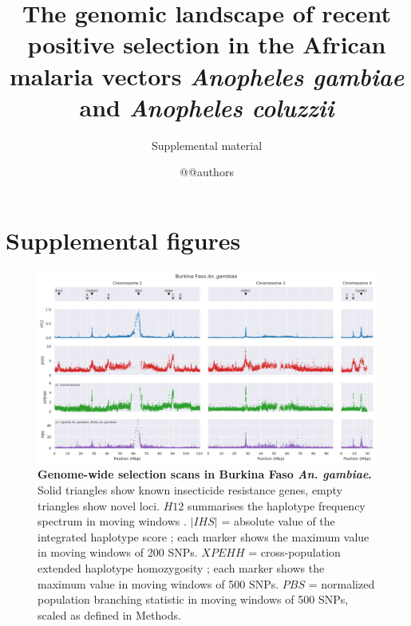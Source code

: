 \documentclass[a4paper,11pt,abstracton,hidelinks]{scrartcl}
\title{
The genomic landscape of recent positive selection in the African malaria vectors \textit{Anopheles gambiae} and \textit{Anopheles coluzzii}
}
\subtitle{\large{Supplemental material}}
\author{@@authors}
\begin{document}
\maketitle

\beginsupplement

\tableofcontents
\listoffigures
\listoftables

\clearpage


\section{Supplemental figures}


\begin{landscape}

\begin{figure}[t!]
	\begin{center}
		\includegraphics*[width=1.05\linewidth,center]{artwork/gwss_bf_gam_gw_ug_gam_gq_gam.png}
	\end{center}
	\caption[Genome-wide selection scans in Burkina Faso \textit{An. gambiae}]{
	\textbf{Genome-wide selection scans in Burkina Faso \textit{An. gambiae}.} 
	Solid triangles show known insecticide resistance genes, empty triangles show novel loci. 
	$H12$ summarises the haplotype frequency spectrum in moving windows \citep{Garud2015}. 
	$|IHS|$ = absolute value of the integrated haplotype score \citep{Voight2006}; each marker shows the maximum value in moving windows of 200 SNPs.
	$XPEHH$ = cross-population extended haplotype homozygosity \citep{Sabeti2007}; each marker shows the maximum value in moving windows of 500 SNPs.
	$PBS$ = normalized population branching statistic \citep{Crawford2017} in moving windows of 500 SNPs, scaled as defined in Methods.
	} 
	\label{fig:gwss_bf_gam}
\end{figure}



\end{landscape}
\end{document}
